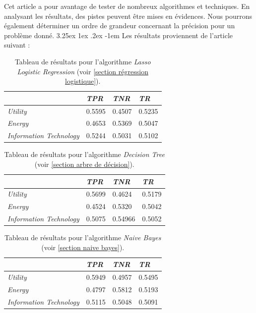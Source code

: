 \documentclass[a4paper, 11pt]{article}
\makeatletter
\newcounter{subsubsubsection}[subsubsection]
\renewcommand\paragraph{\@startsection{paragraph}{5}{\z@}%
  {3.25ex \@plus1ex \@minus.2ex}%
  {-1em}%
  {\normalfont\normalsize\bfseries}}
\makeatother
\begin{document}
Cet article a pour avantage de tester de nombreux algorithmes et techniques. En analysant les résultats, des pistes peuvent être mises en évidences. Nous pourrons également déterminer un ordre de grandeur concernant la précision pour un problème donné.
\paragraph{}
Les résultats proviennent de l'article suivant \cite{machine_learning_automated_trading} :

\begin{table}[h!]
	\centering
\begin{tabular}{|l|l|l|l|}
	\hline
	\ & \textit{TPR} & \textit{TNR} & \textit{TR}\\
	\hline
	\textit{Utility} & 0.5595 & 0.4507 & 0.5235 \\
	\hline
	\textit{Energy} & 0.4653 & 0.5369 & 0.5047\\
	\hline
	\textit{Information Technology} & 0.5244 & 0.5031 & 0.5102\\
	\hline
\end{tabular}
\caption[]{Tableau de résultats pour l'algorithme \textit{Lasso Logistic Regression} (voir \ref{section régression logistique}).}
\end{table}



\begin{table}[h!]
	\centering
\begin{tabular}{|l|l|l|l|}
	\hline
	\ & \textit{TPR} & \textit{TNR} & \textit{TR}\\
	\hline
	\textit{Utility} & 0.5699 & 0.4624 & 0.5179 \\
	\hline
	\textit{Energy} & 0.4524 & 0.5320 & 0.5042\\
	\hline
	\textit{Information Technology} & 0.5075 & 0.54966 & 0.5052\\
	\hline
\end{tabular}
\caption[]{Tableau de résultats pour l'algorithme \textit{Decision Tree} (voir \ref{section arbre de décision}).}
\end{table}



\begin{table}[h!]
	\centering
\begin{tabular}{|l|l|l|l|}
	\hline
	\ & \textit{TPR} & \textit{TNR} & \textit{TR}\\
	\hline
	\textit{Utility} & 0.5949 & 0.4957 & 0.5495 \\
	\hline
	\textit{Energy} & 0.4797 & 0.5812 & 0.5193\\
	\hline
	\textit{Information Technology} & 0.5115 & 0.5048 & 0.5091\\
	\hline
\end{tabular}
\caption[]{Tableau de résultats pour l'algorithme \textit{Naive Bayes} (voir \ref{section naive bayes}).}
\end{table}
\end{document}
